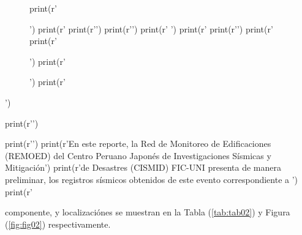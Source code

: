 \documentclass[11pt, a4paper]{report}
\begin{document}
\begin{pycode}
\begin{figure}[H]
\begin{multicols}{2}
print(r'\begin{minipage}[c]{8.2cm}')
print(r'\centering %
print(r'\setlength\fboxsep{0pt}')
print(r'\setlength\fboxrule{0.3pt}')
print(r'  \label{fig:fig01}')
print(r'%
print(r'')
print(r'%
print(r'\end{minipage}')
print(r'\end{multicols} ')
print(r'\end{figure}')

print(r'\vspace{1cm}')

print(r'\noindent')
print(r'En este reporte, la Red de Monitoreo de Edificaciones (REMOED) del Centro Peruano Japonés de Investigaciones Sísmicas y Mitigación')
print(r'de Desastres (CISMID) FIC-UNI presenta de manera preliminar, los registros sísmicos obtenidos de este evento correspondiente a ')
print(r'%

\end{pycode}
componente, y localizaciónes se muestran en la Tabla (\ref{tab:tab02}) y Figura (\ref{fig:fig02}) respectivamente.\\
\end{document}
